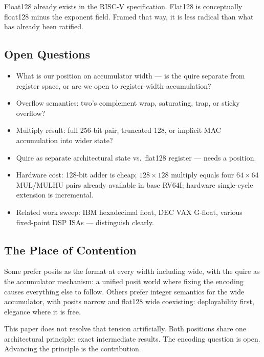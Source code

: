 \documentclass[runningheads]{llncs}
\begin{document}
Float128 already exists in the RISC-V specification. Flat128 is
conceptually float128 minus the exponent field. Framed that way, it is
less radical than what has already been ratified.

\subsection{Open Questions}

\begin{itemize}
  \setlength{\itemsep}{4pt}
  \item What is our position on accumulator width --- is the quire separate
  from register space, or are we open to register-width accumulation?
  \item Overflow semantics: two's complement wrap, saturating, trap, or
  sticky overflow?
  \item Multiply result: full 256-bit pair, truncated 128, or implicit MAC
  accumulation into wider state?
  \item Quire as separate architectural state vs.\ flat128 register ---
  needs a position.
  \item Hardware cost: 128-bit adder is cheap; $128\times128$ multiply
  equals four $64\times64$ MUL/MULHU pairs already available in base
  RV64I; hardware single-cycle extension is incremental.
  \item Related work sweep: IBM hexadecimal float, DEC VAX G-float,
  various fixed-point DSP ISAs --- distinguish clearly.
\end{itemize}

\subsection{The Place of Contention}

Some prefer posits as the format at every width including wide, with
the quire as the accumulator mechanism: a unified posit world where fixing the
encoding causes everything else to follow. Others prefer integer semantics
for the wide accumulator, with posits narrow and flat128 wide
coexisting: deployability first, elegance where it is free.

This paper does not resolve that tension artificially. Both positions
share one architectural principle: exact intermediate results. The
encoding question is open. Advancing the principle is the contribution.


 
 
%

% 
% 
% 
\end{document}
